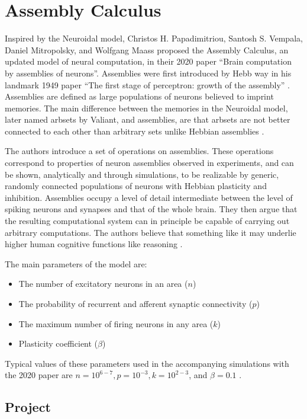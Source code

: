\section{Assembly Calculus}

Inspired by the Neuroidal model, Christos H. Papadimitriou, Santosh S. Vempala, Daniel Mitropolsky, and Wolfgang Maass proposed the Assembly Calculus, an updated model of neural computation, in their 2020 paper ``Brain computation by assemblies of neurons''. Assemblies were first introduced by Hebb way in his landmark 1949 paper ``The first stage of perceptron: growth of the assembly'' \cite{hebb1949first}. Assemblies are defined as large populations of neurons believed to imprint memories. The main difference between the memories in the Neuroidal model, later named arbsets by Valiant, and assemblies, are that arbsets are not better connected to each other than arbitrary sets unlike Hebbian assemblies \cite{valiant2017capacity}.

The authors introduce a set of operations on assemblies. These operations correspond to properties of neuron assemblies observed in experiments, and can be shown, analytically and through simulations, to be realizable by generic, randomly connected populations of neurons with Hebbian plasticity and inhibition. Assemblies occupy a level of detail intermediate between the level of spiking neurons and synapses and that of the whole brain. They then argue that the resulting computational system can in principle be capable of carrying out arbitrary computations. The authors believe that something like it may underlie higher human cognitive functions like reasoning \cite{papadimitriou2020brain}. 

The main parameters of the model are:
\begin{itemize}
    \item The number of excitatory neurons in an area ($n$) 
    \item The probability of recurrent and afferent synaptic connectivity ($p$)
    \item The maximum number of firing neurons in any area ($k$)
    \item Plasticity coefficient ($\beta$)
\end{itemize}

Typical values of these parameters used in the accompanying simulations with the 2020 paper are $n = 10^{6-7} , p = 10^{-3}, k = 10^{2-3}$, and $\beta = 0.1$ \cite{papadimitriou2020brain}.

\subsection{Project}


